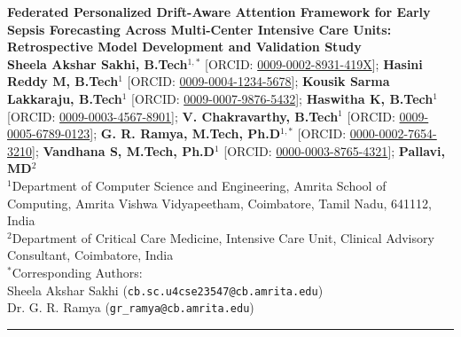 \documentclass[11pt,a4paper]{article}
\begin{document}
\begin{center}
    {\LARGE \textbf{Federated Personalized Drift-Aware Attention Framework for Early Sepsis Forecasting Across Multi-Center Intensive Care Units: Retrospective Model Development and Validation Study}}\\[1.2em]
    
    {\normalsize \textbf{Sheela Akshar Sakhi, B.Tech$^{1,*}$}} [ORCID: \href{https://orcid.org/0009-0002-8931-419X}{0009-0002-8931-419X}]; 
    {\normalsize \textbf{Hasini Reddy M, B.Tech$^1$}} [ORCID: \href{https://orcid.org/0009-0004-1234-5678}{0009-0004-1234-5678}]; 
    {\normalsize \textbf{Kousik Sarma Lakkaraju, B.Tech$^1$}} [ORCID: \href{https://orcid.org/0009-0007-9876-5432}{0009-0007-9876-5432}]; 
    {\normalsize \textbf{Haswitha K, B.Tech$^1$}} [ORCID: \href{https://orcid.org/0009-0003-4567-8901}{0009-0003-4567-8901}]; 
    {\normalsize \textbf{V. Chakravarthy, B.Tech$^1$}} [ORCID: \href{https://orcid.org/0009-0005-6789-0123}{0009-0005-6789-0123}]; 
    {\normalsize \textbf{G. R. Ramya, M.Tech, Ph.D$^{1,*}$}} [ORCID: \href{https://orcid.org/0000-0002-7654-3210}{0000-0002-7654-3210}]; 
    {\normalsize \textbf{Vandhana S, M.Tech, Ph.D$^1$}} [ORCID: \href{https://orcid.org/0000-0003-8765-4321}{0000-0003-8765-4321}]; 
    {\normalsize \textbf{Pallavi, MD$^2$}}\\[0.8em]
    
    \small
    $^1$Department of Computer Science and Engineering, Amrita School of Computing, Amrita Vishwa Vidyapeetham, Coimbatore, Tamil Nadu, 641112, India\\
    $^2$Department of Critical Care Medicine, Intensive Care Unit, Clinical Advisory Consultant, Coimbatore, India\\[0.6em]
    
    $^*$Corresponding Authors: \\
    Sheela Akshar Sakhi (\texttt{cb.sc.u4cse23547@cb.amrita.edu}) \\
    Dr. G. R. Ramya (\texttt{gr\_ramya@cb.amrita.edu})
\end{center}

\vspace{0.8em}
\hrule
\vspace{1em}

\end{document}
